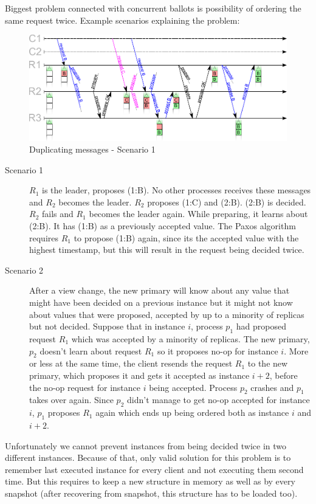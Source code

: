 Biggest problem connected with concurrent ballots is possibility of ordering the same request twice. Example scenarios explaining the problem:
\begin{figure}[ht]
  \includegraphics[keepaspectratio, width=\textwidth]{paxos/duplicating_messages.pdf}
  \caption{Duplicating messages - Scenario 1}
\end{figure}
\begin{description}
  \item [Scenario 1] $R_1$ is the leader, proposes (1:B). No other processes receives these messages and $R_2$ becomes the leader. $R_2$ proposes (1:C) and (2:B). (2:B) is decided. $R_2$ fails and $R_1$ becomes the leader again. While preparing, it learns about (2:B). It has (1:B) as a previously accepted value. The Paxos algorithm requires $R_1$ to propose (1:B) again, since its the accepted value with the highest timestamp, but this will result in the request being decided twice.

  \item [Scenario 2] After a view change, the new primary will know about any value that might have been decided on a previous instance but it might not know about values that were proposed, accepted by up to a minority of replicas but not decided. Suppose that in instance $i$, process $p_1$ had proposed request $R_1$ which was accepted by a minority of replicas. The new primary, $p_2$ doesn't learn about request $R_1$ so it proposes no-op for instance $i$. More or less at the same time, the client resends the request $R_1$ to the new primary, which proposes it and gets it accepted as instance $i+2$, before the no-op request for instance $i$ being accepted. Process $p_2$ crashes and $p_1$ takes over again. Since $p_2$ didn't manage to get no-op accepted for instance $i$, $p_1$ proposes $R_1$ again which ends up being ordered both as instance $i$ and $i+2$.
\end{description} 

Unfortunately we cannot prevent instances from being decided twice in two different instances. Because of that, only valid solution for this problem is to remember last executed instance for every client and not executing them second time. But this requires to keep a new structure in memory as well as by every snapshot (after recovering from snapshot, this structure has to be loaded too).

